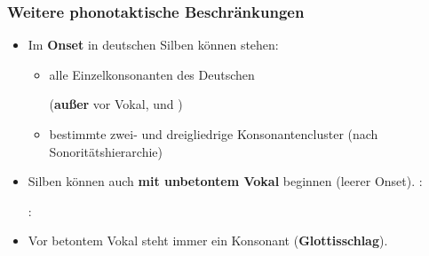 \begin{frame}
\frametitle{Weitere phonotaktische Beschränkungen}

\begin{itemize}
	\item Im \textbf{Onset} in deutschen Silben können stehen:
	
	\begin{itemize}
		\item alle Einzelkonsonanten des Deutschen 
		
		(\textbf{außer} \textipa{[s]} vor Vokal, und \textipa{[N]})

		\item bestimmte zwei- und dreigliedrige Konsonantencluster (nach Sonoritätshierarchie)
	\end{itemize}
	
\pause 
	
	\item Silben können auch \textbf{mit unbetontem Vokal} beginnen (\ras leerer Onset).
	\ea {}: 
	\z
	
	\ea {}:  
	\z

\pause 
	
	\item Vor betontem Vokal steht immer ein Konsonant (\textbf{Glottisschlag}).
	
	\ea
	\z

\end{itemize}

\end{frame}






